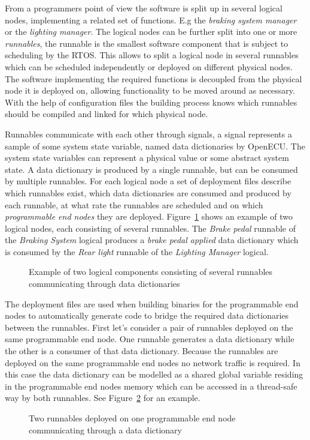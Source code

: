 From a programmers point of view the software is split up in several logical nodes, implementing a related set of functions. E.g the \textit{braking system manager} or the \textit{lighting manager}. The logical nodes can be further split into one or more \textit{runnables}, the runnable is the smallest software component that is subject to scheduling by the RTOS. This allows to split a logical node in several runnables which can be scheduled independently or deployed on different physical nodes. The software implementing the required functions is decoupled from the physical node it is deployed on, allowing functionality to be moved around as necessary. With the help of configuration files the building process knows which runnables should be compiled and linked for which physical node.

Runnables communicate with each other through signals, a signal represents a sample of some system state variable, named data dictionaries by OpenECU. The system state variables can represent a physical value or some abstract system state. A data dictionary is produced by a single runnable, but can be consumed by multiple runnables. For each logical node a set of deployment files describe which runnables exist, which data dictionaries are consumed and produced by each runnable, at what rate the runnables are scheduled and on which \textit{programmable end nodes} they are deployed. Figure~\ref{fig:logical_example} shows an example of two logical nodes, each consisting of several runnables. The \textit{Brake pedal} runnable of the \textit{Braking System} logical produces a \textit{brake pedal applied} data dictionary which is consumed by the \textit{Rear light} runnable of the \textit{Lighting Manager} logical.

\begin{figure}[htb]
    \centering
 \caption{Example of two logical components consisting of several runnables communicating through data dictionaries}
\label{fig:logical_example}
\end{figure}

The deployment files are used when building binaries for the programmable end nodes to automatically generate code to bridge the required data dictionaries between the runnables. First let's consider a pair of runnables deployed on the same programmable end node. One runnable generates a data dictionary while the other is a consumer of that data dictionary. Because the runnables are deployed on the same programmable end nodes no network traffic is required. In this case the data dictionary can be modelled as a shared global variable residing in the programmable end nodes memory which can be accessed in a thread-safe way by both runnables. See Figure~\ref{fig:one_physical} for an example.
\begin{figure}[htb]
    \centering
    \caption{Two runnables deployed on one programmable end node communicating through a data dictionary}
    \label{fig:one_physical}
\end{figure}

